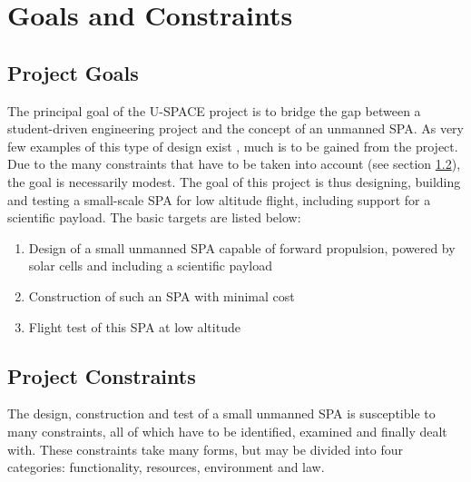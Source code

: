 \chapter{Goals and Constraints}
\label{chap:goals_constraints}
%
\section{Project Goals}
\label{sec:goals}
%
The principal goal of the \ac{U-SPACE} project is to bridge the gap between a student-driven engineering project and the concept of an unmanned \ac{SPA}. As very few examples of this type of design exist \cite{website:solr}, much is to be gained from the project. Due to the many constraints that have to be taken into account (see section \ref{sec:constraints}), the goal is necessarily modest. The goal of this project is thus designing, building and testing a small-scale \ac{SPA} for low altitude flight, including support for a scientific payload. The basic targets are listed below:
%
\begin{enumerate}
\item Design of a small unmanned \ac{SPA} capable of forward propulsion, powered by solar cells and including a scientific payload
\item Construction of such an \ac{SPA} with minimal cost
\item Flight test of this \ac{SPA} at low altitude
\end{enumerate}
%
\section{Project Constraints}
\label{sec:constraints}
%
The design, construction and test of a small unmanned \ac{SPA} is susceptible to many constraints, all of which have to be identified, examined and finally dealt with. These constraints take many forms, but may be divided into four categories: functionality, resources, environment and law.
%

